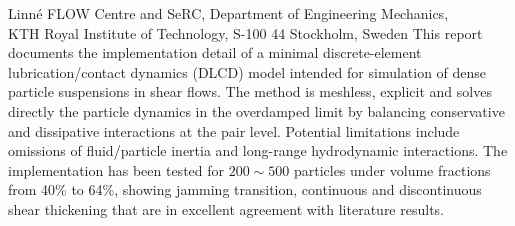 %
%
%
%
%
%
%
\paperaffiliation
{%
  Linn\'e FLOW Centre and SeRC, Department of Engineering Mechanics,\\
  KTH Royal Institute of Technology, S-100 44 Stockholm, Sweden%
}%
%
%
%
\papervolume{}%
%
\papernumber{}
%
\paperpages{}%
%
%
%
\papersummary%
{%
   This report documents the implementation detail of a minimal discrete-element lubrication/contact dynamics (DLCD) model
   intended for simulation of dense particle suspensions in shear flows.
   The method is meshless, explicit and solves directly the particle dynamics in the overdamped limit
   by balancing conservative and dissipative interactions at the pair level.
   Potential limitations include omissions of fluid/particle inertia and long-range hydrodynamic interactions.
   The implementation has been tested for $200\sim 500$ particles under volume fractions from 40\% to 64\%,
   showing jamming transition, continuous and discontinuous shear thickening that are in excellent agreement with literature results.
}%
%
\graphicspath{{paper7/}}%
%
%
%

